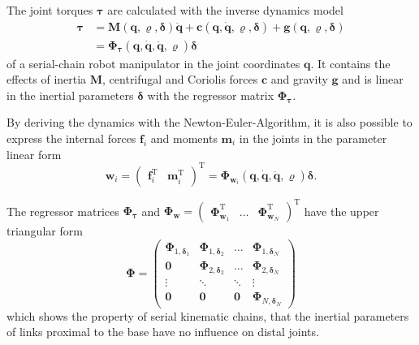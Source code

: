 \documentclass{svproc}
\newcommand{\bm}[1]{\boldsymbol{#1}}
\newcommand{\transp}[0]{{\mathrm{T}}}
\begin{document}
The joint torques $\bm{\tau}$ are calculated with the inverse dynamics model
%
\begin{align}
\bm{\tau} 
&= 
\bm{M}(\bm{q},\bm{\varrho},\bm{\delta}) \ddot{\bm{q}}
+ \bm{c}(\bm{q},\dot{\bm{q}},\bm{\varrho},\bm{\delta})
+ \bm{g}(\bm{q},\bm{\varrho},\bm{\delta}) \label{equ:invdyn_normal} \\
&=
\bm{\Phi}_{\bm{\tau}}(\bm{q},\dot{\bm{q}},\ddot{\bm{q}},\bm{\varrho}) \bm{\delta}
\label{equ:invdyn_reg}
\end{align}
%
of a serial-chain robot manipulator in the joint coordinates $\bm{q}$.
It contains the effects of inertia $\bm{M}$, centrifugal and Coriolis forces $\bm{c}$ and gravity $\bm{g}$ and is linear in the inertial parameters $\bm{\delta}$ with the regressor matrix $\bm{\Phi}_{\bm{\tau}}$.

By deriving the dynamics with the Newton-Euler-Algorithm, it is also possible to express the internal forces $\bm{f}_i$ and moments $\bm{m}_i$ in the joints in the parameter linear form
\begin{equation}
\bm{w}_i = 
\begin{pmatrix} \bm{f}_i^\transp & \bm{m}_i^\transp\end{pmatrix}^\transp
=
\bm{\Phi}_{\bm{w}_i}(\bm{q},\dot{\bm{q}},\ddot{\bm{q}},\bm{\varrho}) \bm{\delta}.
\label{equ:joint_wrench}
\end{equation}

The regressor matrices $\bm{\Phi}_{\bm{\tau}}$ and 
$\bm{\Phi}_{\bm{w}}=\begin{pmatrix} \bm{\Phi}_{\bm{w}_1}^\transp & \dots & \bm{\Phi}_{\bm{w}_N}^\transp\end{pmatrix}^\transp$
have the upper triangular form
\begin{equation}
\bm{\Phi}=
\begin{pmatrix} \bm{\Phi}_{1,\bm{\delta}_1} & \bm{\Phi}_{1,\bm{\delta}_2} & \dots & \bm{\Phi}_{1,\bm{\delta}_N} \\
\bm{0} & \bm{\Phi}_{2,\bm{\delta}_2} & \dots & \bm{\Phi}_{2,\bm{\delta}_N} \\
\vdots & \ddots & \ddots & \vdots \\
\bm{0} & \bm{0} & \bm{0} & \bm{\Phi}_{N,\bm{\delta}_N}
\end{pmatrix}
\label{equ:regressor_triangular}
\end{equation}
%
which shows the property of serial kinematic chains, that the inertial parameters of links proximal to the base have no influence on distal joints.
\end{document}

